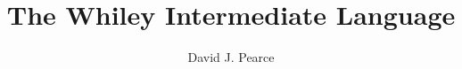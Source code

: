 \documentclass[10pt]{book}
\title{\Huge {\bf The Whiley Intermediate Language}}
\author{David J. Pearce}
\begin{document}

\tableofcontents








\printglossaries



\end{document}

